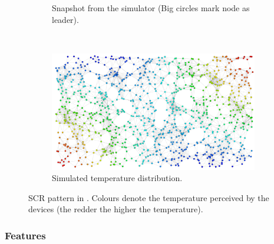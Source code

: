 \begin{figure}
\begin{subfigure}{\textwidth}
    \caption{\label{fig:example-scr-snapshot}Snapshot from the \scafi{} simulator (Big circles mark node as leader).}
  \end{subfigure}\\
  \begin{subfigure}{\textwidth}
    \centering
    \includegraphics[width=0.8\linewidth]{papers/softwarex2021/imgs/temperature-distribution.png}
    \caption{\label{fig:example-temperature}Simulated temperature distribution.}
  \end{subfigure}
  \caption{SCR pattern in \scafi{}. Colours denote the temperature perceived by the devices (the redder the higher the temperature).}  \label{fig:scr}
\end{figure}
  
\subsubsection{Features}
\label{s:impact}

%
%
%
%
%

